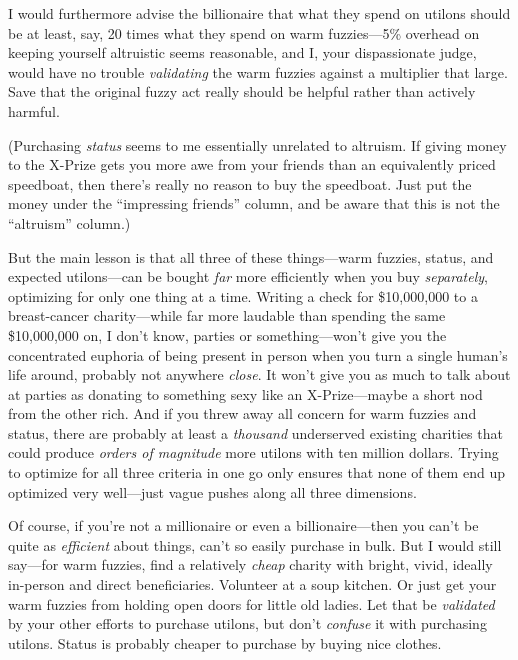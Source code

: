 {
 I would furthermore advise the billionaire that what they spend on
utilons should be at least, say, 20 times what they spend on warm
fuzzies---5\% overhead on keeping yourself altruistic seems reasonable,
and I, your dispassionate judge, would have no trouble
\textit{validating} the warm fuzzies against a multiplier that large.
Save that the original fuzzy act really should be helpful rather than
actively harmful.}

{
 (Purchasing \textit{status} seems to me essentially unrelated to
altruism. If giving money to the X-Prize gets you more awe from your
friends than an equivalently priced speedboat, then
there's really no reason to buy the speedboat. Just put
the money under the ``impressing
friends'' column, and be aware that this is not the
``altruism'' column.)}

{
 But the main lesson is that all three of these things---warm
fuzzies, status, and expected utilons---can be bought \textit{far} more
efficiently when you buy \textit{separately}, optimizing for only one
thing at a time. Writing a check for \$10,000,000 to a breast-cancer
charity---while far more laudable than spending the same \$10,000,000
on, I don't know, parties or
something---won't give you the concentrated euphoria of
being present in person when you turn a single human's
life around, probably not anywhere \textit{close}. It
won't give you as much to talk about at parties as
donating to something sexy like an X-Prize---maybe a short nod from the
other rich. And if you threw away all concern for warm fuzzies and
status, there are probably at least a \textit{thousand} underserved
existing charities that could produce \textit{orders of magnitude} more
utilons with ten million dollars. Trying to optimize for all three
criteria in one go only ensures that none of them end up optimized very
well---just vague pushes along all three dimensions.}

{
 Of course, if you're not a millionaire or even a
billionaire---then you can't be quite as
\textit{efficient} about things, can't so easily
purchase in bulk. But I would still say---for warm fuzzies, find a
relatively \textit{cheap} charity with bright, vivid, ideally in-person
and direct beneficiaries. Volunteer at a soup kitchen. Or just get your
warm fuzzies from holding open doors for little old ladies. Let that be
\textit{validated} by your other efforts to purchase utilons, but
don't \textit{confuse} it with purchasing utilons.
Status is probably cheaper to purchase by buying nice clothes.}

